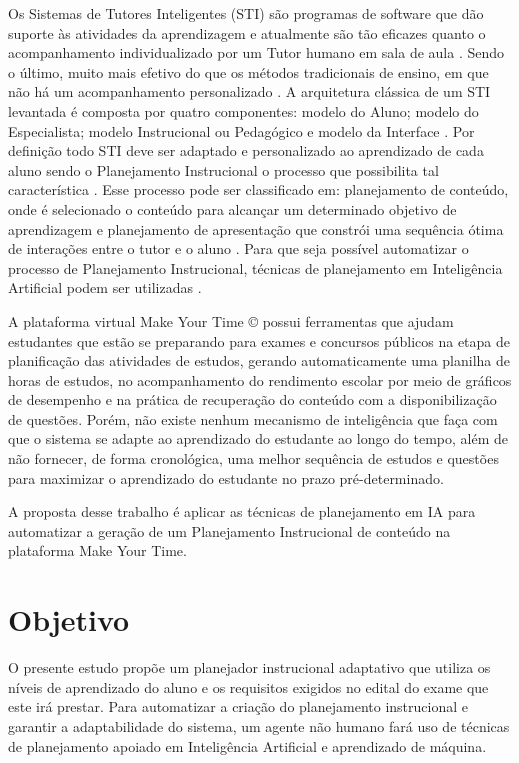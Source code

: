 \documentclass[
12pt,				%
oneside,			%
a4paper,			%
english,			%
brazil				%
]{abntex2ppgsi}
\begin{document}
Os Sistemas de Tutores Inteligentes (STI) são programas de software que dão suporte às atividades da aprendizagem \cite{gamboa2002} e atualmente são tão eficazes quanto o acompanhamento individualizado por um Tutor humano em sala de aula \cite{vanlehn2011}. Sendo o último, muito mais efetivo do que os métodos tradicionais de ensino, em que não há um acompanhamento personalizado \cite{bloom1984}. A arquitetura clássica de um STI levantada é composta por quatro componentes: modelo do Aluno; modelo do Especialista; modelo Instrucional ou Pedagógico e modelo da Interface \cite{kaplan1995}. Por definição todo STI deve ser adaptado e personalizado ao aprendizado de cada aluno \cite{woo1991} sendo o Planejamento Instrucional o processo que possibilita tal característica \cite{mohan2003}. Esse processo pode ser classificado em: planejamento de conteúdo, onde é selecionado o conteúdo para alcançar um determinado objetivo de aprendizagem \cite{vassileva1996} e planejamento de apresentação que constrói uma sequência ótima de interações entre o tutor e o aluno \cite{mohan2003}. Para que seja possível automatizar o processo de Planejamento Instrucional, técnicas de planejamento em Inteligência Artificial podem ser utilizadas \cite{cho2000, vassileva1996, brusilovsky2003}.

A plataforma virtual Make Your Time © possui ferramentas que ajudam estudantes que estão se preparando para exames e concursos públicos na etapa de planificação das atividades de estudos, gerando automaticamente uma planilha de horas de estudos, no acompanhamento do rendimento escolar por meio de gráficos de desempenho e na prática de recuperação do conteúdo com a disponibilização de questões. Porém, não existe nenhum mecanismo de inteligência que faça com que o sistema se adapte ao aprendizado do estudante ao longo do tempo, além de não fornecer, de forma cronológica, uma melhor sequência de estudos e questões para maximizar o aprendizado do estudante no prazo pré-determinado.

A proposta desse trabalho é aplicar as técnicas de planejamento em IA para automatizar a geração de um Planejamento Instrucional de conteúdo na plataforma Make Your Time.

\chapter{Objetivo}

O presente estudo propõe um planejador instrucional adaptativo que utiliza os níveis de aprendizado do aluno e os requisitos exigidos no edital do exame que este irá prestar. Para automatizar a criação do planejamento instrucional e garantir a adaptabilidade do sistema, um agente não humano fará uso de técnicas de planejamento apoiado em Inteligência Artificial e aprendizado de máquina.
\end{document}
